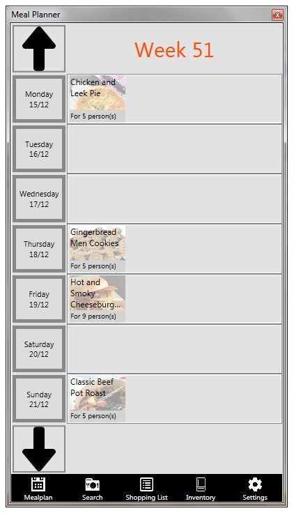 \begin{figure}[H]
\centering
\begin{minipage}{.33\textwidth}
  \centering
  \includegraphics[width=.9\linewidth]{Grafik/MealPlanPage}
  \label{fig:MealPlanPage}
\end{minipage}%
\begin{minipage}{.33\textwidth}
  \centering

\end{minipage}
\end{figure}
